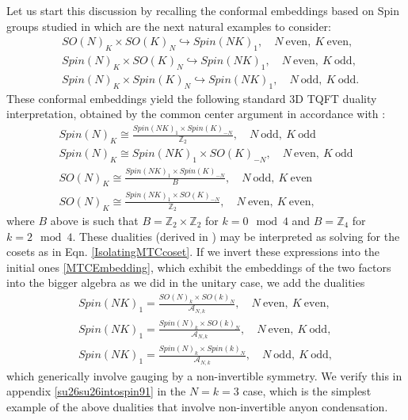 \documentclass[11pt]{article}
\numberwithin{equation}{section}
\begin{document}
Let us start this discussion by recalling the conformal embeddings based on Spin groups studied in \cite{Aharony:2016jvv,Cordova:2017vab} which are the next natural examples to consider:
\begin{align}
    & SO(N)_{K} \times SO(K)_{N} \hookrightarrow Spin(NK)_{1}, \quad N \  \mathrm{even}, \ K \ \mathrm{even}, \\[0.3cm]
    & Spin(N)_{K} \times SO(K)_{N} \hookrightarrow Spin(NK)_{1}, \quad N \  \mathrm{even}, \ K \ \mathrm{odd}, \\[0.3cm]
    & Spin(N)_{K} \times Spin(K)_{N} \hookrightarrow Spin(NK)_{1}, \quad N \  \mathrm{odd}, \ K \ \mathrm{odd}.
\end{align}
These conformal embeddings yield the following standard 3D TQFT duality interpretation, obtained by the common center argument in accordance with \cite{Aharony:2016jvv,Cordova:2017vab}:
\begin{align}
    Spin(N)_{K} \cong \frac{Spin(NK)_{1} \times Spin(K)_{-N}}{\mathbb{Z}_{2}}, \quad N \  \mathrm{odd}, \ K \ \mathrm{odd} \label{stdcosetduality1} \\[0.3cm]
    Spin(N)_{K} \cong Spin(NK)_{1} \times SO(K)_{-N}, \quad N \  \mathrm{even}, \ K \ \mathrm{odd} \label{stdcosetduality2} \\[0.3cm]
    SO(N)_{K} \cong \frac{Spin(NK)_{1} \times Spin(K)_{-N}}{B}, \quad N \  \mathrm{odd}, \ K \ \mathrm{even} \label{stdcosetduality3} \\[0.3cm]
    SO(N)_{K} \cong \frac{Spin(NK)_{1} \times SO(K)_{-N}}{\mathbb{Z}_{2}}, \quad N \  \mathrm{even}, \ K \ \mathrm{even}, \label{stdcosetduality4}
\end{align}
where $B$ above is such that $B = \mathbb{Z}_{2} \times \mathbb{Z}_{2}$ for $k=0 \mod 4$ and $B = \mathbb{Z}_{4}$ for $k=2 \mod 4$. These dualities (derived in \cite{Aharony:2016jvv}) may be interpreted as solving for the cosets as in Eqn. \eqref{IsolatingMTCcoset}. If we invert these expressions into the initial ones \eqref{MTCEmbedding}, which exhibit the embeddings of the two factors into the bigger algebra as we did in the unitary case, we add the dualities
\begin{align}
    Spin(NK)_{1} = \frac{SO(N)_{k} \times SO(k)_{N}}{\mathcal{A}_{N,k}}, \quad N \  \mathrm{even}, \ K \ \mathrm{even}, \label{spinduality1} \\[0.3cm]
    Spin(NK)_{1} = \frac{Spin(N)_{k} \times SO(k)_{N}}{\mathcal{A}_{N,k}}, \quad N \  \mathrm{even}, \ K \ \mathrm{odd}, \label{spinduality2} \\[0.3cm]
    Spin(NK)_{1} = \frac{Spin(N)_{k} \times Spin(k)_{N}}{\mathcal{A}_{N,k}}, \quad N \  \mathrm{odd}, \ K \ \mathrm{odd}, \label{spinduality3}
\end{align}
which generically involve gauging by a non-invertible symmetry. We verify this in appendix \ref{su26su26intospin91} in the $N=k=3$ case, which is the simplest example of the above dualities that involve non-invertible anyon condensation. 
\end{document}
